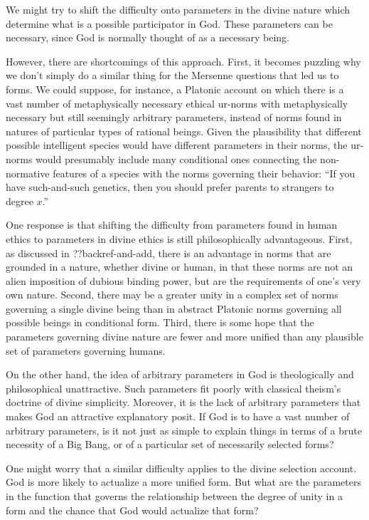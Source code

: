 We might try to shift the difficulty onto parameters in the divine nature which determine what is a possible participator in God.
These parameters can be necessary, since God is normally thought of as a necessary being. 

However, there are shortcomings of this approach. First, it becomes puzzling why we don't simply do a similar thing for the Mersenne questions that 
led us to forms. We could suppose, for instance, a Platonic account on which there is a vast number of metaphysically necessary ethical ur-norms
with metaphysically necessary but still seemingly arbitrary parameters, instead of norms found in natures of particular types of 
rational beings. Given the plausibility that different possible intelligent species would have different parameters in their norms, 
the ur-norms would presumably include many conditional ones connecting the non-normative features of a species with the norms governing
their behavior: ``If you have such-and-such genetics, then you should prefer parents to strangers to degree $x$.'' 

One response is that shifting the difficulty from parameters found in human ethics to parameters in divine ethics is still philosophically
advantageous. First, as discussed in ??backref-and-add, there is an advantage in norms that are grounded in a nature, whether divine or human, 
in that these norms are not an alien imposition of dubious binding power, but are the requirements of one's very own nature. Second, there may
be a greater unity in a complex set of norms governing a single divine being than in abstract Platonic norms governing all possible beings
in conditional form. Third, there is some hope that the parameters governing divine nature are fewer and more unified than any plausible set 
of parameters governing humans. 

On the other hand, the idea of arbitrary parameters in God is theologically and philosophical unattractive. Such parameters fit poorly 
with classical theism's doctrine of divine simplicity. Moreover, it is the lack of arbitrary parameters that makes God an attractive 
explanatory posit. If God is to have a vast number of arbitrary parameters, is it not just as simple to explain things in terms of 
a brute necessity of a Big Bang, or of a particular set of necessarily selected forms? 

One might worry that a similar difficulty applies to the divine selection account. God is more likely to actualize a more unified 
form. But what are the parameters in the function that governs the relationship between the degree of unity in a form and the chance that 
God would actualize that form? 

